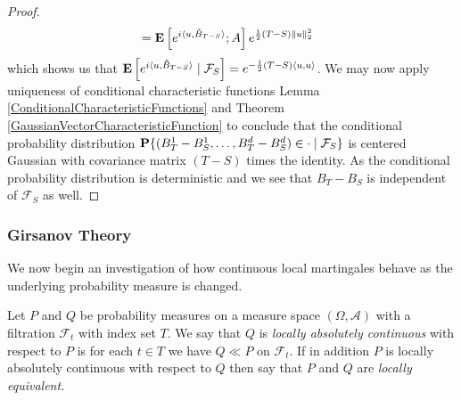 \begin{proof}
\begin{align*}
&=  \expectation{ e^{i\langle u, \tilde{B}_{T-S} \rangle}; A} e^{\frac{1}{2}(T-S) \norm{u}_2^2}
\end{align*}
which shows us that $\cexpectationlong{\mathcal{F}_S}{e^{i \langle u, \tilde{B}_{T-S} \rangle}} = e^{-\frac{1}{2} (T-S) \langle u, u \rangle}$.  We may now apply uniqueness of conditional characteristic functions Lemma \ref{ConditionalCharacteristicFunctions} and Theorem \ref{GaussianVectorCharacteristicFunction} to conclude that the conditional probability distribution $\cprobability{\mathcal{F}_S}{ (B_{T}^1 - B_S^1,\dotsc, B_{T}^d - B_S^d) \in \cdot}$ is centered Gaussian with covariance matrix $(T-S)$ times the identity. As the conditional probability distribution is deterministic and we see that $B_T -B_S$ is independent of $\mathcal{F}_S$ as well.
\end{proof}

\subsubsection{Girsanov Theory}

We now begin an investigation of how continuous local martingales behave as the underlying probability measure is changed.  

\begin{defn}Let $P$ and $Q$ be probability measures on a measure space $(\Omega, \mathcal{A})$ with a filtration $\mathcal{F}_t$ with index set $T$.  We say that $Q$ is \emph{locally absolutely continuous} with respect to $P$ is for each $t \in T$ we have $Q \ll P$ on $\mathcal{F}_t$.  If in addition $P$ is locally absolutely continuous with respect to $Q$ then say that $P$ and $Q$ are \emph{locally equivalent}.
\end{defn}

